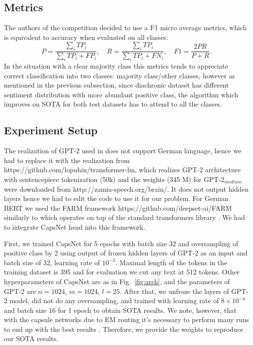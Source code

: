 \documentclass{article}
\begin{document}
\subsection{Metrics}
The authors of the competition decided to use a F1 micro average metrics, which is equivalent to accuracy when evaluated on all classes:
$$
P = \frac{\sum_i TP_i}{\sum_i TP_i + FP_i}, \quad R = \frac{\sum_i TP_i}{\sum_i TP_i + FN_i}, \quad F1 = \frac{2 P R}{P + R}.
$$
In the situation with a clear majority class this metrics tends to appreciate correct classification into two classes: majority class/other classes, however as mentioned in the previous subsection, since diachronic dataset has different sentiment distribution with more abundant positive class, the algorithm which improves on SOTA for both test datasets has to attend to all the classes.


\subsection{Experiment Setup}
The realization of GPT-2 used in \cite{heinsen2019algorithm} does not support German language, hence we had to replace it with the realization from \\https://github.com/lopuhin/transformer-lm, which realizes GPT-2 architecture with sentencepiece tokenization (50k) and the weights (345 M) for GPT-2$_{medium}$ were downloaded from http://zamia-speech.org/brain/. It does not output hidden layers hence we had to edit the code to use it for our problem. For German BERT we used the FARM framework https://github.com/deepset-ai/FARM similarly to \cite{kostic2020} which operates on top of the standard transformers library \cite{Wolf2019HuggingFacesTS}. We had to integrate CapsNet head into this framework.

First, we trained CapsNet for 5 epochs with batch size 32 and oversampling of positive class by 2 using output of frozen hidden layers of GPT-2 as an input and batch size of 32, learning rate of $10^{-3}$. Maximal length of the tokens in the training dataset is 395 and for evaluation we cut any text at 512 tokens. Other hyperparameters of CapsNet are as in Fig.~\ref{fig:arch}, and the parameters of GPT-2 are $n=1024$, $m=1024$, $l=25$. After that, we unfroze the layers of GPT-2 model, did not do any oversampling, and trained with learning rate of $8\times 10^{-4}$ and batch size 16 for 1 epoch to obtain SOTA results. We note, however, that with the capsule networks due to EM routing it's necessary to perform many runs to end up with the best results \cite{heinsen2019algorithm}. Therefore, we provide the weights to reproduce our SOTA results.
\end{document}
